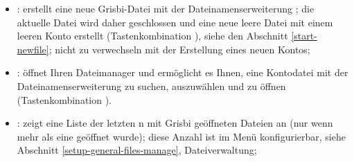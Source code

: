 \vspace{2mm}
\noindent
\begin{minipage}{.7\linewidth}
	\begin{itemize}[rightmargin=.6cm]
		\item {}: erstellt eine neue Grisbi-Datei mit der \gls{Dateinamenserweiterung} ; die aktuelle Datei wird daher geschlossen und eine neue leere Datei mit einem leeren Konto erstellt (Tastenkombination ), siehe den Abschnitt \vref{start-newfile}; nicht zu verwechseln mit der Erstellung eines neuen Kontos;%
		\item {}: öffnet Ihren Dateimanager und ermöglicht es Ihnen, eine Kontodatei mit der \gls{Dateinamenserweiterung}  zu suchen, auszuwählen und zu öffnen (Tastenkombination ).%
		\item {}: zeigt eine Liste der letzten n mit Grisbi geöffneten Dateien an (nur wenn mehr als eine geöffnet wurde); diese Anzahl ist im Menü  konfigurierbar, siehe Abschnitt \vref{setup-general-files-manage}, {Dateiverwaltung};
	\end{itemize}
\end{minipage}
